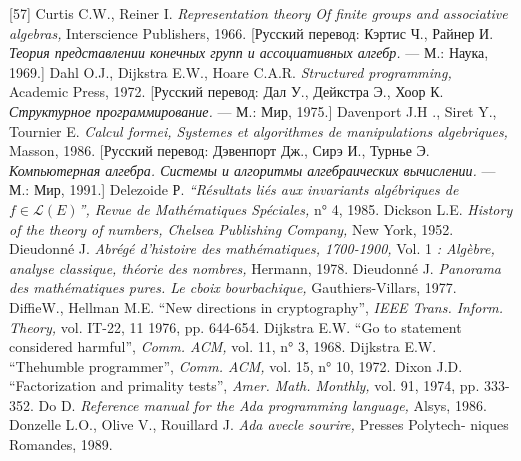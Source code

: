 \documentclass{../../template/mai_book}
\begin{document}
[57] Curtis C.W., Reiner I. {\itshape Representation theory Of finite groups and associative algebras,} Interscience Publishers, 1966. [Русский перевод: Кэртис Ч., Райнер И. {\itshape Теория представлении конечных групп и ассоци­ативных алгебр.} — М.: Наука, 1969.] \newline
[58] Dahl O.J., Dijkstra E.W., Hoare C.A.R. {\itshape Structured programming,} Academic Press, 1972. [Русский перевод: Дал У., Дейкстра Э.,
Хоор К. {\itshape Структурное программирование.} — М.: Мир, 1975.] \newline
[59] Davenport J.H ., Siret Y., Tournier E. {\itshape Calcul formei, Systemes et algorithmes de manipulations algebriques,} Masson, 1986. [Русский перевод: Дэвенпорт Дж., Сирэ И., Турнье Э. {\itshape Компьютерная
алгебра. Системы и алгоритмы алгебраических вычислении.} — М.:
Мир, 1991.] \newline
[60] Delezoide Р. {\itshape “R\'{e}sultats li\'{e}s aux invariants alg\'{e}briques de $f \in \mathcal{L}(E)$”, Revue de Math\'{e}matiques Sp\'{e}ciales,} n° 4, 1985. \newline
[61] Dickson L.E. {\itshape History of the theory of numbers, Chelsea Publishing Company,} New York, 1952. \newline
[62] Dieudonn\'{e} J. {\itshape Abr\'{e}g\'{e} d’histoire des math\'{e}matiques, 1700-1900, }Vol. 1 {\itshape : Alg\`{e}bre, analyse classique, th\'{e}orie des nombres,} Hermann, 1978. \newline
[63] Dieudonn\'{e} J. {\itshape Panorama des math\'{e}matiques pures. Le cboix bourbachique,} Gauthiers-Villars, 1977. \newline
[64] DiffieW., Hellman M.E. “New directions in cryptography”, {\itshape IEEE Trans. Inform. Theory,} vol. IT-22, 11 1976, pp. 644-654. \newline
[65] Dijkstra E.W. “Go to statement considered harmful”, {\itshape Comm. ACM,} vol. 11, n° 3, 1968. \newline
[66] Dijkstra E.W. “Thehumble programmer”, {\itshape Comm. ACM,} vol. 15, n° 10, 1972. \newline
[67] Dixon J.D. “Factorization and primality tests”, {\itshape Amer. Math. Monthly,} vol. 91, 1974, pp. 333-352. \newline
[68] Do D. {\itshape Reference manual for the Ada programming language,} Alsys, 1986. \newline
[69] Donzelle L.O., Olive V., Rouillard J. {\itshape Ada avecle sourire,} Presses Polytech- \newline niques Romandes, 1989. \newline
\end{document}
